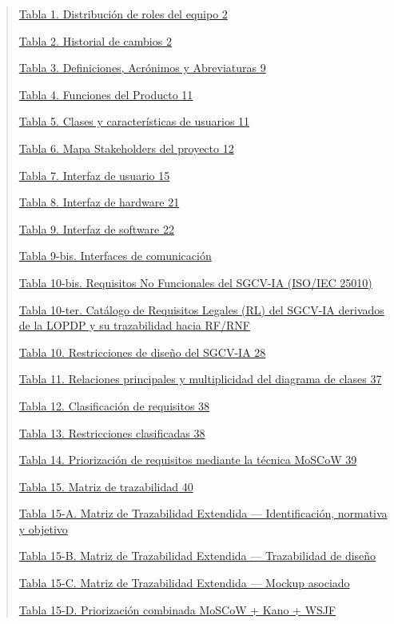 \documentclass[
]{article}
\begin{document}
\begin{quote}
\hyperref[_bookmark1]{Tabla 1. Distribución de roles del equipo 2}

\hyperref[_bookmark2]{Tabla 2. Historial de cambios 2}

\hyperref[_bookmark8]{Tabla 3. Definiciones, Acrónimos y Abreviaturas 9}

\hyperref[_bookmark15]{Tabla 4. Funciones del Producto 11}

\hyperref[_bookmark17]{Tabla 5. Clases y características de usuarios 11}

\hyperref[_bookmark19]{Tabla 6. Mapa Stakeholders del proyecto 12}

\hyperref[_bookmark24]{Tabla 7. Interfaz de usuario 15}

\hyperref[table8]{Tabla 8. Interfaz de hardware 21}

\hyperref[tabla-9.-interfaz-de-software]{Tabla 9. Interfaz de software 22}

\hyperref[tabla-9-bis-interfaces-de-comunicacion]{Tabla 9-bis. Interfaces de comunicación}

\hyperref[table-rnf]{Tabla 10-bis. Requisitos No Funcionales del SGCV-IA (ISO/IEC 25010)}

\hyperref[_bookmark41c]{Tabla 10-ter. Catálogo de Requisitos Legales (RL) del SGCV-IA derivados de la LOPDP y su trazabilidad hacia RF/RNF}

\hyperref[table10]{Tabla 10. Restricciones de diseño del SGCV-IA 28}

\hyperref[table11]{Tabla 11. Relaciones principales y multiplicidad del diagrama de clases 37}

\hyperref[table12]{Tabla 12. Clasificación de requisitos 38}

\hyperref[table13]{Tabla 13. Restricciones clasificadas 38}

\hyperref[_bookmark64]{Tabla 14. Priorización de requisitos mediante la técnica MoSCoW 39}

\hyperref[_bookmark66]{Tabla 15. Matriz de trazabilidad 40}

\hyperref[table15a]{Tabla 15-A. Matriz de Trazabilidad Extendida --- Identificación, normativa y objetivo}

\hyperref[table15b]{Tabla 15-B. Matriz de Trazabilidad Extendida --- Trazabilidad de diseño}

\hyperref[table15c]{Tabla 15-C. Matriz de Trazabilidad Extendida --- Mockup asociado}

\hyperref[table15d]{Tabla 15-D. Priorización combinada MoSCoW + Kano + WSJF}


\end{quote}
\end{document}
